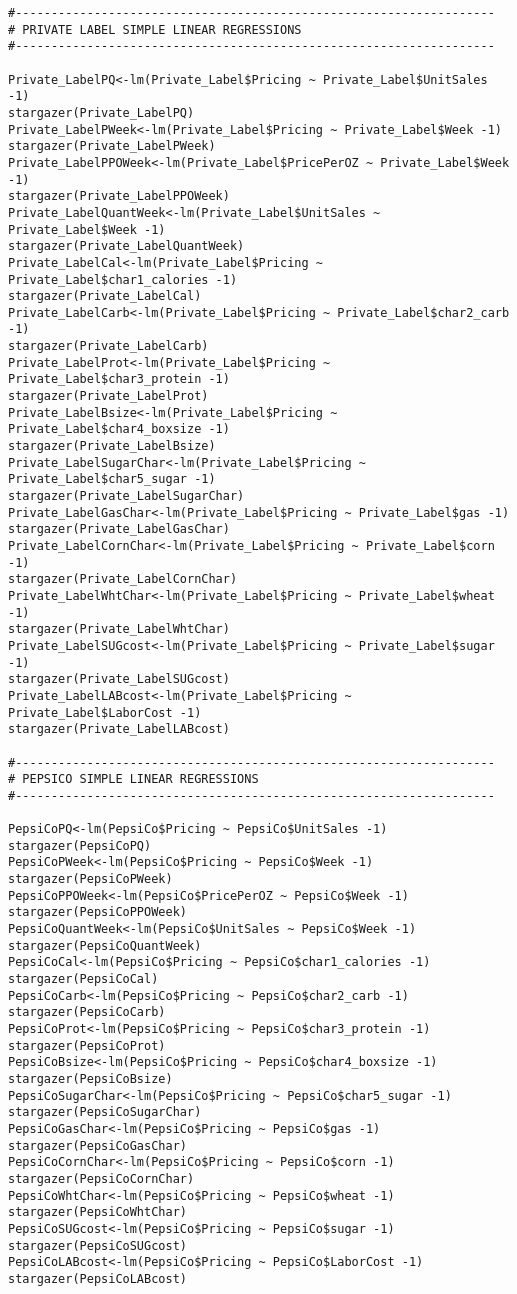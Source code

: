 \documentclass[12pt,english]{article}
\begin{document}
\begin{lstlisting}
#-------------------------------------------------------------------
# PRIVATE LABEL SIMPLE LINEAR REGRESSIONS
#-------------------------------------------------------------------

Private_LabelPQ<-lm(Private_Label$Pricing ~ Private_Label$UnitSales -1)
stargazer(Private_LabelPQ)
Private_LabelPWeek<-lm(Private_Label$Pricing ~ Private_Label$Week -1)
stargazer(Private_LabelPWeek)
Private_LabelPPOWeek<-lm(Private_Label$PricePerOZ ~ Private_Label$Week -1)
stargazer(Private_LabelPPOWeek)
Private_LabelQuantWeek<-lm(Private_Label$UnitSales ~ Private_Label$Week -1)
stargazer(Private_LabelQuantWeek)
Private_LabelCal<-lm(Private_Label$Pricing ~ Private_Label$char1_calories -1)
stargazer(Private_LabelCal)
Private_LabelCarb<-lm(Private_Label$Pricing ~ Private_Label$char2_carb -1)
stargazer(Private_LabelCarb)
Private_LabelProt<-lm(Private_Label$Pricing ~ Private_Label$char3_protein -1)
stargazer(Private_LabelProt)
Private_LabelBsize<-lm(Private_Label$Pricing ~ Private_Label$char4_boxsize -1)
stargazer(Private_LabelBsize)
Private_LabelSugarChar<-lm(Private_Label$Pricing ~ Private_Label$char5_sugar -1)
stargazer(Private_LabelSugarChar)
Private_LabelGasChar<-lm(Private_Label$Pricing ~ Private_Label$gas -1)
stargazer(Private_LabelGasChar)
Private_LabelCornChar<-lm(Private_Label$Pricing ~ Private_Label$corn -1)
stargazer(Private_LabelCornChar)
Private_LabelWhtChar<-lm(Private_Label$Pricing ~ Private_Label$wheat -1)
stargazer(Private_LabelWhtChar)
Private_LabelSUGcost<-lm(Private_Label$Pricing ~ Private_Label$sugar -1)
stargazer(Private_LabelSUGcost)
Private_LabelLABcost<-lm(Private_Label$Pricing ~ Private_Label$LaborCost -1)
stargazer(Private_LabelLABcost)

#-------------------------------------------------------------------
# PEPSICO SIMPLE LINEAR REGRESSIONS
#-------------------------------------------------------------------

PepsiCoPQ<-lm(PepsiCo$Pricing ~ PepsiCo$UnitSales -1)
stargazer(PepsiCoPQ)
PepsiCoPWeek<-lm(PepsiCo$Pricing ~ PepsiCo$Week -1)
stargazer(PepsiCoPWeek)
PepsiCoPPOWeek<-lm(PepsiCo$PricePerOZ ~ PepsiCo$Week -1)
stargazer(PepsiCoPPOWeek)
PepsiCoQuantWeek<-lm(PepsiCo$UnitSales ~ PepsiCo$Week -1)
stargazer(PepsiCoQuantWeek)
PepsiCoCal<-lm(PepsiCo$Pricing ~ PepsiCo$char1_calories -1)
stargazer(PepsiCoCal)
PepsiCoCarb<-lm(PepsiCo$Pricing ~ PepsiCo$char2_carb -1)
stargazer(PepsiCoCarb)
PepsiCoProt<-lm(PepsiCo$Pricing ~ PepsiCo$char3_protein -1)
stargazer(PepsiCoProt)
PepsiCoBsize<-lm(PepsiCo$Pricing ~ PepsiCo$char4_boxsize -1)
stargazer(PepsiCoBsize)
PepsiCoSugarChar<-lm(PepsiCo$Pricing ~ PepsiCo$char5_sugar -1)
stargazer(PepsiCoSugarChar)
PepsiCoGasChar<-lm(PepsiCo$Pricing ~ PepsiCo$gas -1)
stargazer(PepsiCoGasChar)
PepsiCoCornChar<-lm(PepsiCo$Pricing ~ PepsiCo$corn -1)
stargazer(PepsiCoCornChar)
PepsiCoWhtChar<-lm(PepsiCo$Pricing ~ PepsiCo$wheat -1)
stargazer(PepsiCoWhtChar)
PepsiCoSUGcost<-lm(PepsiCo$Pricing ~ PepsiCo$sugar -1)
stargazer(PepsiCoSUGcost)
PepsiCoLABcost<-lm(PepsiCo$Pricing ~ PepsiCo$LaborCost -1)
stargazer(PepsiCoLABcost)


\end{lstlisting}
\end{document}
